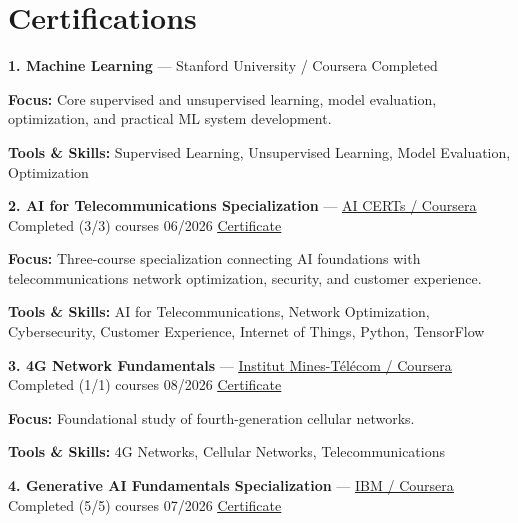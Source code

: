 \documentclass[9pt,letterpaper]{extarticle}
\begin{document}
\section{Certifications}
\noindent\textbf{1. Machine Learning} {\small --- Stanford University / Coursera \textbar{} Completed}\par
\textbf{Focus:} Core supervised and unsupervised learning, model evaluation, optimization, and practical ML system development.\par
{\small\textbf{Tools \& Skills:} Supervised Learning, Unsupervised Learning, Model Evaluation, Optimization\par}
\vspace{2pt}
\noindent\textbf{2. AI for Telecommunications Specialization} {\small --- \textcolor{blue}{\underline{\href{https://coursera.org/verify/specialization/D8Y6MVC0XM51}{AI CERTs / Coursera}}} \textbar{} Completed (3/3) courses \textbar{} 06/2026 \textbar{} \textcolor{blue}{\underline{\href{https://waseemraza844.github.io/portfolio/certificates/wireless/ai-for-telecom.pdf}{Certificate}}}}\par
\textbf{Focus:} Three-course specialization connecting AI foundations with telecommunications network optimization, security, and customer experience.\par
{\small\textbf{Tools \& Skills:} AI for Telecommunications, Network Optimization, Cybersecurity, Customer Experience, Internet of Things, Python, TensorFlow\par}
\vspace{2pt}
\noindent\textbf{3. 4G Network Fundamentals} {\small --- \textcolor{blue}{\underline{\href{https://coursera.org/verify/DLW1YN474VZJ}{Institut Mines-Télécom / Coursera}}} \textbar{} Completed (1/1) courses \textbar{} 08/2026 \textbar{} \textcolor{blue}{\underline{\href{https://waseemraza844.github.io/portfolio/certificates/wireless/4g-network-fundamentals.pdf}{Certificate}}}}\par
\textbf{Focus:} Foundational study of fourth-generation cellular networks.\par
{\small\textbf{Tools \& Skills:} 4G Networks, Cellular Networks, Telecommunications\par}
\vspace{2pt}
\noindent\textbf{4. Generative AI Fundamentals Specialization} {\small --- \textcolor{blue}{\underline{\href{https://coursera.org/verify/specialization/IPQKDOHF3IV2}{IBM / Coursera}}} \textbar{} Completed (5/5) courses \textbar{} 07/2026 \textbar{} \textcolor{blue}{\underline{\href{https://waseemraza844.github.io/portfolio/certificates/genai/ibm-genai-fundamentals/ibm-genai-fundamentals.pdf}{Certificate}}}}\par
\end{document}

